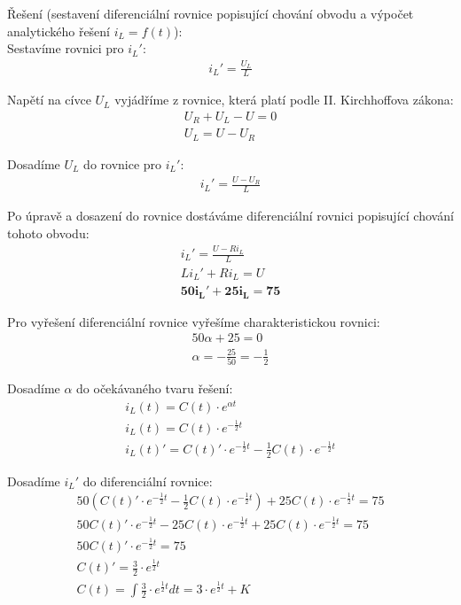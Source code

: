 \documentclass[12pt,a4paper]{article}
\begin{document}
	{\Large Řešení (sestavení diferenciální rovnice popisující chování obvodu a výpočet analytického řešení $i_L = f(t)$):} \\

	Sestavíme rovnici pro $i_L'$:
	\begin{gather*}
		i_L' = \frac{U_L}{L}
	\end{gather*}

	Napětí na cívce $U_L$ vyjádříme z rovnice, která platí podle II. Kirchhoffova zákona:
	\begin{gather*}
		U_R + U_L - U = 0 \\
		U_L = U - U_R
	\end{gather*}

	Dosadíme $U_L$ do rovnice pro $i_L'$:
	\begin{gather*}
		i_L' = \frac{U - U_R}{L}
	\end{gather*}

	Po úpravě a dosazení do rovnice dostáváme diferenciální rovnici popisující chování tohoto obvodu:
	\begin{gather*}
		i_L' = \frac{U - R i_L}{L} \\
		L i_L' + R i_L = U \\
		\boldsymbol{50 i_L' + 25 i_L = 75}
	\end{gather*}

	Pro vyřešení diferenciální rovnice vyřešíme charakteristickou rovnici:
	\begin{gather*}
		50 \alpha + 25 = 0 \\
		\alpha = -\frac{25}{50} = -\frac{1}{2}
	\end{gather*}

	Dosadíme $\alpha$ do očekávaného tvaru řešení:
	\begin{gather*}
		i_L(t) = C(t) \cdot e^{\alpha t} \\
		i_L(t) = C(t) \cdot e^{-\frac{1}{2} t} \\
		i_L(t)' = C(t)' \cdot e^{-\frac{1}{2} t} - \frac{1}{2} C(t) \cdot e^{-\frac{1}{2} t}
	\end{gather*}

	Dosadíme $i_L'$ do diferenciální rovnice:
	\begin{gather*}
		50 (C(t)' \cdot e^{-\frac{1}{2} t} - \frac{1}{2} C(t) \cdot e^{-\frac{1}{2} t}) + 25 C(t) \cdot e^{-\frac{1}{2} t} = 75 \\
		50 C(t)' \cdot e^{-\frac{1}{2} t} - 25 C(t) \cdot e^{-\frac{1}{2} t} + 25 C(t) \cdot e^{-\frac{1}{2} t} = 75 \\
		50 C(t)' \cdot e^{-\frac{1}{2} t} = 75 \\
		C(t)' = \frac{3}{2} \cdot e^{\frac{1}{2} t} \\
		C(t) = \int \frac{3}{2} \cdot e^{\frac{1}{2} t} dt = 3 \cdot e^{\frac{1}{2} t} + K
	\end{gather*}
\end{document}
